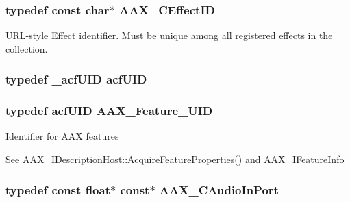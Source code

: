 \subsubsection[{A\+A\+X\+\_\+\+C\+Effect\+I\+D}]{\setlength{\rightskip}{0pt plus 5cm}typedef const char$\ast$ {\bf A\+A\+X\+\_\+\+C\+Effect\+I\+D}}\label{a00149_a4b8f04e1a56624da97ace7a28d550dcc}


U\+R\+L-\/style Effect identifier. Must be unique among all registered effects in the collection. 

\hypertarget{a00149_a66d978418e20352380f1c775c9180a93}{}
\subsubsection[{acf\+U\+I\+D}]{\setlength{\rightskip}{0pt plus 5cm}typedef {\bf \+\_\+acf\+U\+I\+D} {\bf acf\+U\+I\+D}}\label{a00149_a66d978418e20352380f1c775c9180a93}
\hypertarget{a00149_a53d6cf8a08224b3e813333e411ce798e}{}
\subsubsection[{A\+A\+X\+\_\+\+Feature\+\_\+\+U\+I\+D}]{\setlength{\rightskip}{0pt plus 5cm}typedef {\bf acf\+U\+I\+D} {\bf A\+A\+X\+\_\+\+Feature\+\_\+\+U\+I\+D}}\label{a00149_a53d6cf8a08224b3e813333e411ce798e}
Identifier for A\+A\+X features

See \hyperlink{a00091_aa0d9e27d0207113f98c217d870bfa5e9}{A\+A\+X\+\_\+\+I\+Description\+Host\+::\+Acquire\+Feature\+Properties()} and \hyperlink{a00100}{A\+A\+X\+\_\+\+I\+Feature\+Info} \hypertarget{a00149_a901605fce9f6c52b770f95916a5db4cf}{}
\subsubsection[{A\+A\+X\+\_\+\+C\+Audio\+In\+Port}]{\setlength{\rightskip}{0pt plus 5cm}typedef const float$\ast$ const$\ast$ {\bf A\+A\+X\+\_\+\+C\+Audio\+In\+Port}}\label{a00149_a901605fce9f6c52b770f95916a5db4cf}



